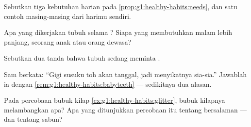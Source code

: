\begin{exercise}[$\star$]\label{exo:g1:healthy-habits:6}
Sebutkan tiga kebutuhan harian pada \cref{prop:g1:healthy-habits:needs},
dan satu contoh masing-masing dari harimu sendiri.
\end{exercise}

\begin{exercise}[$\star$]\label{exo:g1:healthy-habits:7}
Apa yang dikerjakan tubuh selama ? Siapa yang membutuhkan malam
lebih panjang, seorang anak atau orang dewasa?
\end{exercise}

\begin{exercise}[$\star$]\label{exo:g1:healthy-habits:8}
Sebutkan dua tanda bahwa tubuh sedang meminta .
\end{exercise}

\begin{exercise}[$\star\star$]\label{exo:g1:healthy-habits:9}
Sam berkata: ``Gigi susuku toh akan tanggal, jadi menyikatnya
sia-sia.'' Jawablah ia dengan
\cref{rem:g1:healthy-habits:babyteeth} --- sedikitnya dua alasan.
\end{exercise}

\begin{exercise}[$\star\star$]\label{exo:g1:healthy-habits:10}
Pada percobaan bubuk kilap \cref{ex:g1:healthy-habits:glitter}, bubuk
kilapnya melambangkan apa? Apa yang ditunjukkan percobaan itu tentang
bersalaman --- dan tentang sabun?
\end{exercise}
